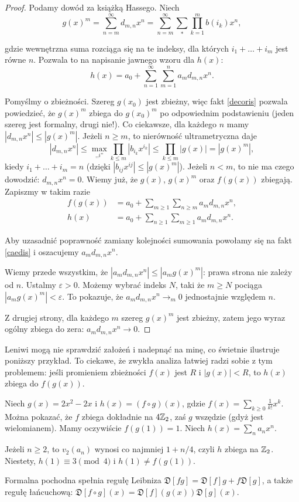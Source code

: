 \begin{proof}
	Podamy dowód za książką Hassego.
	Niech
	\[
		g(x)^m = \sum_{n=m}^\infty d_{m, n} x^n = \sum_{n=m}^\infty \sum_{*} \prod_{k=1}^m b(i_k) x^n,
	\]

	gdzie wewnętrzna suma rozciąga się na te indeksy, dla których $i_1 + \ldots + i_m$ jest równe $n$.
	Pozwala to na napisanie jawnego wzoru dla $h(x)$:
	\[
		h(x) = a_0 + \sum_{n = 1}^\infty \sum_{m = 1}^n a_m d_{m, n} x^n.
	\]

	Pomyślmy o zbieżności.
	Szereg $g(x_0)$ jest zbieżny, więc fakt \ref{decoris} pozwala powiedzieć, że $g(x)^m$ zbiega do $g(x_0)^m$ po odpowiednim podstawieniu (jeden szereg jest formalny, drugi nie!).
	Co ciekawsze, dla każdego $n$ mamy $|d_{m,n}x^n| \le |g(x)^m|$.
	Jeżeli $n \ge m$, to nierówność ultrametryczna daje
	\[
		|d_{m,n}x^n| \le \max_{\mbox{,,}i\mbox{''}} \prod_{k \le m} |b_{i_k} x^{i_k}| \le \prod_{k \le m} |g(x)| = |g(x)^m|,
	\]
	kiedy $i_1 + \ldots + i_m = n$ (dzięki $|b_{ij} x^{ij}| \le |g(x)^m|$).
	Jeżeli $n < m$, to nie ma czego dowodzić: $d_{m,n}x^n = 0$.
	Wiemy już, że $g(x)$, $g(x)^m$ oraz $f(g(x))$ zbiegają.
	Zapiszmy w takim razie
	\begin{align*}
	 	f(g(x))	& = a_0 + \sum_{m \ge 1} \sum_{n \ge m} a_m d_{m,n}x^n,\\
		h(x) & = a_0 + \sum_{n \ge 1} \sum_{m \ge 1} a_md_{m,n} x^n.
	\end{align*}

	Aby uzasadnić poprawność zamiany kolejności sumowania powołamy się na fakt \ref{caedis} i oszacujemy $a_md_{m,n}x^n$.

	Wiemy przede wszystkim, że $|a_md_{m,n}x^n| \le |a_mg(x)^m|$: prawa strona nie zależy od $n$.
	Ustalmy $\varepsilon > 0$.
	Możemy wybrać indeks $N$, taki że $m \ge N$ pociąga $|a_mg(x)^m| < \varepsilon$.
	To pokazuje, że $a_md_{m,n}x^n \to_m 0$ jednostajnie względem $n$.

	Z drugiej strony, dla każdego $m$ szereg $g(x)^m$ jest zbieżny, zatem jego wyraz ogólny zbiega do zera: $a_m d_{m,n}x^n \to 0$.
\end{proof}

Leniwi mogą nie sprawdzić założeń i nadepnąć na minę, co świetnie ilustruje poniższy przykład.
To ciekawe, że zwykła analiza łatwiej radzi sobie z tym problemem: jeśli promieniem zbieżności $f(x)$ jest $R $ i $|g(x)| < R $, to $h(x)$ zbiega do $f(g(x))$.

\begin{przyklad}\label{leniwy}
	Niech $g(x) = 2x^2 - 2x$ i $h(x) = (f \circ g)(x)$, gdzie $f(x) = \sum_{k \ge 0} \frac{1}{k!} x^k$.
	Można pokazać, że $f$ zbiega dokładnie na $4 \mathbb Z_2$, zaś $g$ wszędzie (gdyż jest wielomianem).
	Mamy oczywiście $f(g(1)) = 1$.
	Niech $h(x) = \sum_n a_n x^n$.
	
	Jeżeli $n \ge 2$, to $v_2(a_n)$ wynosi co najmniej $1 + n / 4$, czyli $h$ zbiega na $\mathbb Z_2$.
	Niestety, $h(1) \equiv 3 \pmod {4}$ i $h(1) \neq f(g(1))$.
\end{przyklad}

\begin{fakt}
	Formalna pochodna spełnia regułę Leibniza $\mathfrak D[fg] = \mathfrak D[f]g + f \mathfrak D[g]$, a także regułę łańcuchową: $\mathfrak D[f \circ g](x) = \mathfrak D [f](g(x)) \mathfrak D [g](x)$.
\end{fakt}